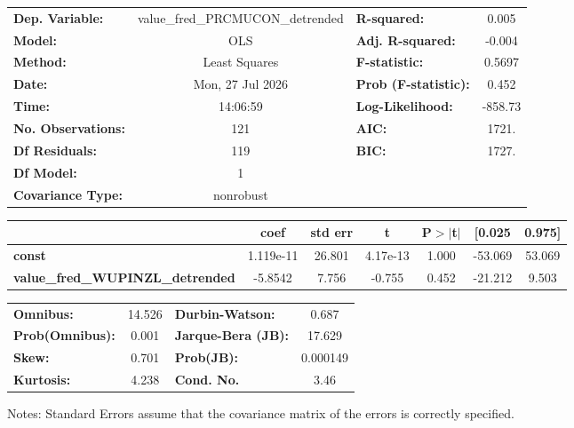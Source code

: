 \begin{center}
\begin{tabular}{lclc}
\toprule
\textbf{Dep. Variable:}                  & value\_fred\_PRCMUCON\_detrended & \textbf{  R-squared:         } &     0.005   \\
\textbf{Model:}                          &               OLS                & \textbf{  Adj. R-squared:    } &    -0.004   \\
\textbf{Method:}                         &          Least Squares           & \textbf{  F-statistic:       } &    0.5697   \\
\textbf{Date:}                           &         Mon, 27 Jul 2026         & \textbf{  Prob (F-statistic):} &    0.452    \\
\textbf{Time:}                           &             14:06:59             & \textbf{  Log-Likelihood:    } &   -858.73   \\
\textbf{No. Observations:}               &                 121              & \textbf{  AIC:               } &     1721.   \\
\textbf{Df Residuals:}                   &                 119              & \textbf{  BIC:               } &     1727.   \\
\textbf{Df Model:}                       &                   1              & \textbf{                     } &             \\
\textbf{Covariance Type:}                &            nonrobust             & \textbf{                     } &             \\
\bottomrule
\end{tabular}
\begin{tabular}{lcccccc}
                                         & \textbf{coef} & \textbf{std err} & \textbf{t} & \textbf{P$> |$t$|$} & \textbf{[0.025} & \textbf{0.975]}  \\
\midrule
\textbf{const}                           &    1.119e-11  &       26.801     &  4.17e-13  &         1.000        &      -53.069    &       53.069     \\
\textbf{value\_fred\_WUPINZL\_detrended} &      -5.8542  &        7.756     &    -0.755  &         0.452        &      -21.212    &        9.503     \\
\bottomrule
\end{tabular}
\begin{tabular}{lclc}
\textbf{Omnibus:}       & 14.526 & \textbf{  Durbin-Watson:     } &    0.687  \\
\textbf{Prob(Omnibus):} &  0.001 & \textbf{  Jarque-Bera (JB):  } &   17.629  \\
\textbf{Skew:}          &  0.701 & \textbf{  Prob(JB):          } & 0.000149  \\
\textbf{Kurtosis:}      &  4.238 & \textbf{  Cond. No.          } &     3.46  \\
\bottomrule
\end{tabular}
\end{center}

Notes: \newline
 [1] Standard Errors assume that the covariance matrix of the errors is correctly specified.